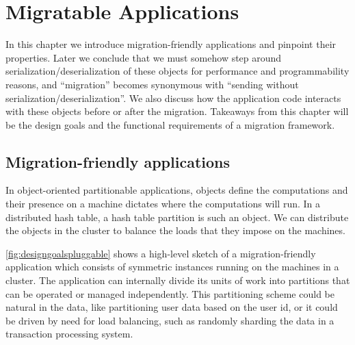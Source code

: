 \chapter{Migratable Applications}
\label{chap:migratableapps}

In this chapter we introduce migration-friendly applications and pinpoint
their properties. Later we conclude that
we must somehow step around serialization/deserialization of these objects for
performance and programmability reasons, and ``migration'' becomes
synonymous with ``sending without serialization/deserialization''.
We also discuss how the
application code interacts with these objects before or after the migration.
Takeaways from this chapter will be the design goals and the functional
requirements of a migration framework.
%
%
%
%


\section{Migration-friendly applications}
\label{sec:themigfriendlyapps}
In object-oriented partitionable applications, objects define the
computations and their presence on a machine dictates where the
computations will run. In a distributed hash table, a hash table partition
is such an object. We can distribute the objects in the cluster to balance
the loads that they impose on the machines.

\autoref{fig:designgoalspluggable} shows a high-level sketch of a
migration-friendly application which consists of symmetric instances
running on the machines in a cluster. The application can internally
divide its units of work into partitions that can be operated or
managed independently.
This partitioning scheme could be natural in the data, like
partitioning user data based on the user id, or it could be driven
by need for load balancing, such as randomly sharding the data
in a transaction processing system.


